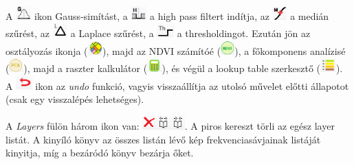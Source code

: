 \documentclass[a4paper,12pt]{book}
\begin{document}
A \includegraphics[height=0.55cm]{gaussikon} ikon Gauss-simítást, a \includegraphics[height=0.55cm]{highpassikon} a high pass filtert indítja, az \includegraphics[height=0.55cm]{medianikon} a medián szűrést, az \includegraphics[height=0.55cm]{laplaceikon} a Laplace szűrést, a \includegraphics[height=0.55cm]{thresholdikon} a thresholdingot. Ezután jön az osztályozás ikonja (\includegraphics[height=0.55cm]{clusterikon}), majd az NDVI számítóé (\includegraphics[height=0.55cm]{ndviikon}), a főkomponens analízisé (\includegraphics[height=0.55cm]{pcaikon}), majd a raszter kalkulátor (\includegraphics[height=0.55cm]{calcikon}), és végül a lookup table szerkesztő (\includegraphics[height=0.55cm]{lookupikon}). A \includegraphics[height=0.55cm]{undoikon} ikon az \textit{undo} funkció, vagyis visszaállítja az utolsó művelet előtti állapotot (csak egy visszalépés lehetséges). 

A \textit{Layers} fülön három ikon van: \includegraphics[height=0.55cm]{layer_list_icons.png}. A piros kereszt törli az egész layer listát. A kinyíló könyv az összes listán lévő kép frekvenciasávjainak listáját kinyitja, míg a bezáródó könyv bezárja őket. 
\end{document}
